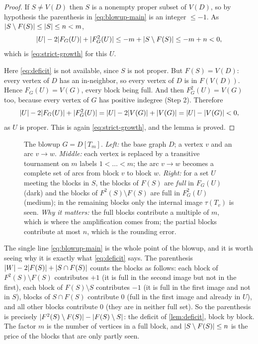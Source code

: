 \begin{proof}
If $S\ne V(D)$ then $S$ is a nonempty proper subset of $V(D)$, so by hypothesis the parenthesis in
\eqref{eq:blowup-main} is an integer $\le-1$. As $\lvert S\setminus F(S)\rvert\le\lvert S\rvert\le n<m$,
\[
 \lvert U\rvert-2\lvert F_G(U)\rvert+\lvert F_G^2(U)\rvert\le -m+\lvert S\setminus F(S)\rvert\le-m+n<0,
\]
which is \eqref{eq:strict-growth} for this $U$.

Here \eqref{eq:deficit} is not available, since $S$ is not proper. But $F(S)=V(D)$: every vertex of
$D$ has an in-neighbor, so every vertex of $D$ is in $F(V(D))$. Hence $F_G(U)=V(G)$, every block
being full. And then $F_G^2(U)=V(G)$ too, because every vertex of $G$ has positive indegree (Step
2). Therefore
\[
 \lvert U\rvert-2\lvert F_G(U)\rvert+\lvert F_G^2(U)\rvert=\lvert U\rvert-2\lvert V(G)\rvert+\lvert V(G)\rvert=\lvert U\rvert-\lvert V(G)\rvert<0,
\]
as $U$ is proper. This is again \eqref{eq:strict-growth}, and the lemma is proved.
\end{proof}

\begin{figure}[t]
\centering

\caption{The blowup $G=D[T_m]$. \emph{Left:} the base graph $D$; a vertex $v$ and an arc $v\to w$.
 \emph{Middle:} each vertex is replaced by a transitive tournament on $m$ labels $1<\dots<m$; the arc
 $v\to w$ becomes a complete set of arcs from block $v$ to block $w$. \emph{Right:} for a set $U$
 meeting the blocks in $S$, the blocks of $F(S)$ are \emph{full} in $F_G(U)$ (dark) and the blocks of
 $F^2(S)\setminus F(S)$ are full in $F_G^2(U)$ (medium); in the remaining blocks only the internal
 image $\tau(T_v)$ is seen. \emph{Why it matters:} the full blocks contribute a multiple of $m$,
 which is where the amplification comes from; the partial blocks contribute at most $n$, which is
 the rounding error.}
\label{fig:blowup}
\end{figure}

\begin{remark}\label{rem:blowup-read}
The single line \eqref{eq:blowup-main} is the whole point of the blowup, and it is worth seeing why
it is exactly what \cref{eq:deficit} says. The parenthesis
$\lvert W\rvert-2\lvert F(S)\rvert+\lvert S\cap F(S)\rvert$ counts the blocks as follows: each block of
$F^2(S)\setminus F(S)$ contributes $+1$ (it is full in the second image but not in the first), each
block of $F(S)\setminus S$ contributes $-1$ (it is full in the first image and not in $S$), blocks
of $S\cap F(S)$ contribute $0$ (full in the first image and already in $U$), and all other blocks
contribute $0$ (they are in neither full set). So the parenthesis is precisely
$\lvert F^2(S)\setminus F(S)\rvert-\lvert F(S)\setminus S\rvert$: the deficit of \cref{lem:deficit}, block by
block. The factor $m$ is the number of vertices in a full block, and $\lvert S\setminus F(S)\rvert\le n$
is the price of the blocks that are only partly seen.
\end{remark}

